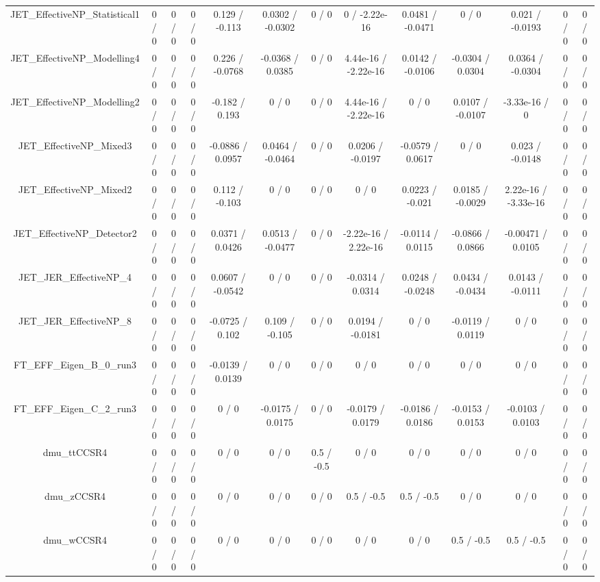 \documentclass[10pt]{article}
\begin{document}
\begin{table}[htbp]
\begin{center}
\begin{tabular}{|c|c|c|c|c|c|c|c|c|c|c|c|c|}
  JET_EffectiveNP_Statistical1 & 0 / 0 & 0 / 0 & 0 / 0 & 0.129 / -0.113 & 0.0302 / -0.0302 & 0 / 0 & 0 / -2.22e-16 & 0.0481 / -0.0471 & 0 / 0 & 0.021 / -0.0193 & 0 / 0 & 0 / 0 \\ 
  JET_EffectiveNP_Modelling4 & 0 / 0 & 0 / 0 & 0 / 0 & 0.226 / -0.0768 & -0.0368 / 0.0385 & 0 / 0 & 4.44e-16 / -2.22e-16 & 0.0142 / -0.0106 & -0.0304 / 0.0304 & 0.0364 / -0.0304 & 0 / 0 & 0 / 0 \\ 
  JET_EffectiveNP_Modelling2 & 0 / 0 & 0 / 0 & 0 / 0 & -0.182 / 0.193 & 0 / 0 & 0 / 0 & 4.44e-16 / -2.22e-16 & 0 / 0 & 0.0107 / -0.0107 & -3.33e-16 / 0 & 0 / 0 & 0 / 0 \\ 
  JET_EffectiveNP_Mixed3 & 0 / 0 & 0 / 0 & 0 / 0 & -0.0886 / 0.0957 & 0.0464 / -0.0464 & 0 / 0 & 0.0206 / -0.0197 & -0.0579 / 0.0617 & 0 / 0 & 0.023 / -0.0148 & 0 / 0 & 0 / 0 \\ 
  JET_EffectiveNP_Mixed2 & 0 / 0 & 0 / 0 & 0 / 0 & 0.112 / -0.103 & 0 / 0 & 0 / 0 & 0 / 0 & 0.0223 / -0.021 & 0.0185 / -0.0029 & 2.22e-16 / -3.33e-16 & 0 / 0 & 0 / 0 \\ 
  JET_EffectiveNP_Detector2 & 0 / 0 & 0 / 0 & 0 / 0 & 0.0371 / 0.0426 & 0.0513 / -0.0477 & 0 / 0 & -2.22e-16 / 2.22e-16 & -0.0114 / 0.0115 & -0.0866 / 0.0866 & -0.00471 / 0.0105 & 0 / 0 & 0 / 0 \\ 
  JET_JER_EffectiveNP_4 & 0 / 0 & 0 / 0 & 0 / 0 & 0.0607 / -0.0542 & 0 / 0 & 0 / 0 & -0.0314 / 0.0314 & 0.0248 / -0.0248 & 0.0434 / -0.0434 & 0.0143 / -0.0111 & 0 / 0 & 0 / 0 \\ 
  JET_JER_EffectiveNP_8 & 0 / 0 & 0 / 0 & 0 / 0 & -0.0725 / 0.102 & 0.109 / -0.105 & 0 / 0 & 0.0194 / -0.0181 & 0 / 0 & -0.0119 / 0.0119 & 0 / 0 & 0 / 0 & 0 / 0 \\ 
  FT_EFF_Eigen_B_0_run3 & 0 / 0 & 0 / 0 & 0 / 0 & -0.0139 / 0.0139 & 0 / 0 & 0 / 0 & 0 / 0 & 0 / 0 & 0 / 0 & 0 / 0 & 0 / 0 & 0 / 0 \\ 
  FT_EFF_Eigen_C_2_run3 & 0 / 0 & 0 / 0 & 0 / 0 & 0 / 0 & -0.0175 / 0.0175 & 0 / 0 & -0.0179 / 0.0179 & -0.0186 / 0.0186 & -0.0153 / 0.0153 & -0.0103 / 0.0103 & 0 / 0 & 0 / 0 \\ 
  dmu_ttCCSR4 & 0 / 0 & 0 / 0 & 0 / 0 & 0 / 0 & 0 / 0 & 0.5 / -0.5 & 0 / 0 & 0 / 0 & 0 / 0 & 0 / 0 & 0 / 0 & 0 / 0 \\ 
  dmu_zCCSR4 & 0 / 0 & 0 / 0 & 0 / 0 & 0 / 0 & 0 / 0 & 0 / 0 & 0.5 / -0.5 & 0.5 / -0.5 & 0 / 0 & 0 / 0 & 0 / 0 & 0 / 0 \\ 
  dmu_wCCSR4 & 0 / 0 & 0 / 0 & 0 / 0 & 0 / 0 & 0 / 0 & 0 / 0 & 0 / 0 & 0 / 0 & 0.5 / -0.5 & 0.5 / -0.5 & 0 / 0 & 0 / 0 \\ 

\end{tabular}
\end{center}
\end{table}
\end{document}
